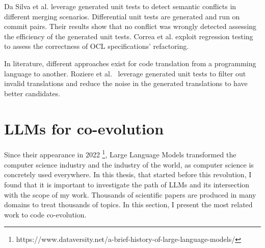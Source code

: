 Da Silva et al. \cite{DASILVA2024112070} leverage generated unit tests to detect semantic conflicts in different merging scenarios. Differential unit tests are generated and run on commit pairs. Their results show that no conflict was wrongly detected assessing the efficiency of the generated unit tests. Correa et al. \cite{correa2007refactoring} exploit regression testing to assess the correctness of OCL specifications' refactoring.


In literature, different approaches exist for code translation from a programming language to another. Roziere et al.~\cite{roziere2021leveraging} leverage generated unit tests to filter out invalid translations and reduce the noise in the generated translations to have better candidates.
 
  \section{LLMs for co-evolution }
  \label{llmsforcoevolution}
  Since their appearance in 2022 \footnote{https://www.dataversity.net/a-brief-history-of-large-language-models/}, Large Language Models transformed the computer science industry and the industry of the world, as computer science is concretely used everywhere. In this thesis, that started before this revolution, I found that it is important to investigate the path of LLMs and its intersection with the scope of my work. Thousands of scientific papers are produced in many domains to treat thousands of topics. In this section, I present the most related work to code co-evolution.
  
